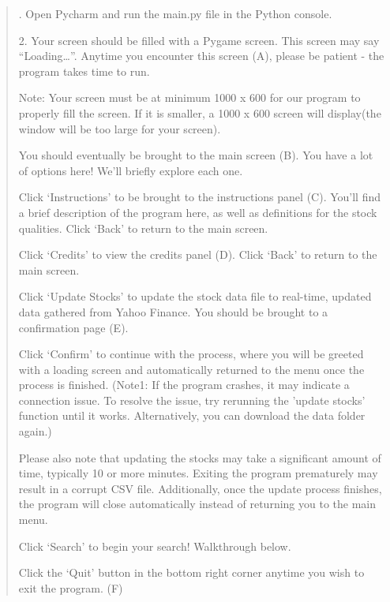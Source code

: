 \documentclass[fontsize=12pt]{article}
\begin{document}
\begin{quote}
. Open Pycharm and run the main.py file in the Python console.

2. Your screen should be filled with a Pygame screen. This screen may say “Loading…”. Anytime you encounter this screen (A), please be patient - the program takes time to run.

Note: Your screen must be at minimum 1000 x 600 for our program to properly fill the screen. If it is smaller, a 1000 x 600 screen will display(the window will be too large for your screen).

You should eventually be brought to the main screen (B). You have a lot of options here! We’ll briefly explore each one.

Click ‘Instructions’ to be brought to the instructions panel (C). You’ll find a brief description of the program here, as well as definitions for the stock qualities. Click ‘Back’ to return to the main screen.

Click ‘Credits’ to view the credits panel (D). Click ‘Back’ to return to the main screen.

Click ‘Update Stocks’ to update the stock data file to real-time, updated data gathered from Yahoo Finance. You should be brought to a confirmation page (E). 

Click ‘Confirm’ to continue with the process, where you will be greeted with a loading screen and automatically returned to the menu once the process is finished. (Note1: If the program crashes, it may indicate a connection issue. To resolve the issue, try rerunning the 'update stocks' function until it works. Alternatively, you can download the data folder again.)

Please also note that updating the stocks may take a significant amount of time, typically 10 or more minutes. Exiting the program prematurely may result in a corrupt CSV file. Additionally, once the update process finishes, the program will close automatically instead of returning you to the main menu.

Click ‘Search’ to begin your search! Walkthrough below.

Click the ‘Quit’ button in the bottom right corner anytime you wish to exit the program. (F)
\end{quote}
\end{document}
